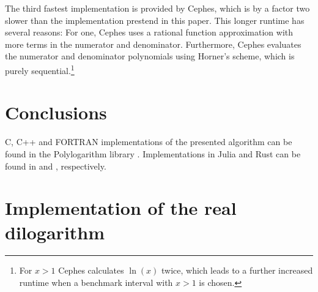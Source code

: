 \documentclass[10pt,DIV16,twocolumn,numbers=noenddot]{scrartcl}
\begin{document}
The third fastest implementation is provided by Cephes, which is by a
factor two slower than the implementation prestend in this paper.
This longer runtime has several reasons: For one, Cephes uses a
rational function approximation with more terms in the numerator and
denominator.  Furthermore, Cephes evaluates the numerator and
denominator polynomials using Horner's scheme, which is purely
sequential.\footnote{For $x>1$ Cephes calculates $\ln(x)$ twice, which
  leads to a further increased runtime when a benchmark interval with
  $x>1$ is chosen.}

\section{Conclusions}

C, C++ and FORTRAN implementations of the presented algorithm can be
found in the Polylogarithm library \cite{polylogarithm}.
Implementations in Julia and Rust can be found in \cite{PolyLog.jl}
and \cite{polylog}, respectively.

\appendix

\section{Implementation of the real dilogarithm}






\end{document}
